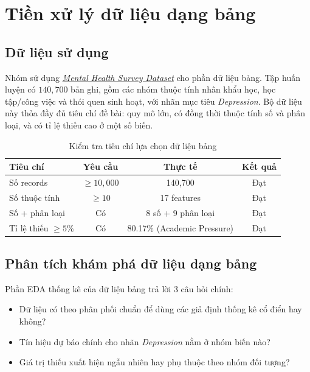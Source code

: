 \section{Tiền xử lý dữ liệu dạng bảng}

\subsection{Dữ liệu sử dụng}
Nhóm sử dụng \href{https://www.kaggle.com/competitions/playground-series-s4e11/data}{\textit{Mental Health Survey Dataset}} cho phần dữ liệu bảng. Tập huấn luyện có $140{,}700$ bản ghi, gồm các nhóm thuộc tính nhân khẩu học, học tập/công việc và thói quen sinh hoạt, với nhãn mục tiêu \textit{Depression}. Bộ dữ liệu này thỏa đầy đủ tiêu chí đề bài: quy mô lớn, có đồng thời thuộc tính số và phân loại, và có tỉ lệ thiếu cao ở một số biến.

\begin{table}[H]
    \centering
    \begin{tabular}{|l|c|c|c|}
        \hline
        \textbf{Tiêu chí}      & \textbf{Yêu cầu} & \textbf{Thực tế}            & \textbf{Kết quả} \\
        \hline
        Số records             & $\geq 10{,}000$  & 140{,}700                   & Đạt              \\
        \hline
        Số thuộc tính          & $\geq 10$        & 17 features                 & Đạt              \\
        \hline
        Số + phân loại         & Có               & 8 số + 9 phân loại          & Đạt              \\
        \hline
        Tỉ lệ thiếu $\geq 5\%$ & Có               & 80.17\% (Academic Pressure) & Đạt              \\
        \hline
    \end{tabular}
    \caption{Kiểm tra tiêu chí lựa chọn dữ liệu bảng}
\end{table}

\subsection{Phân tích khám phá dữ liệu dạng bảng}
Phần EDA thống kê của dữ liệu bảng trả lời 3 câu hỏi chính:
\begin{itemize}
    \item Dữ liệu có theo phân phối chuẩn để dùng các giả định thống kê cổ điển hay không?
    \item Tín hiệu dự báo chính cho nhãn \textit{Depression} nằm ở nhóm biến nào?
    \item Giá trị thiếu xuất hiện ngẫu nhiên hay phụ thuộc theo nhóm đối tượng?
\end{itemize}

